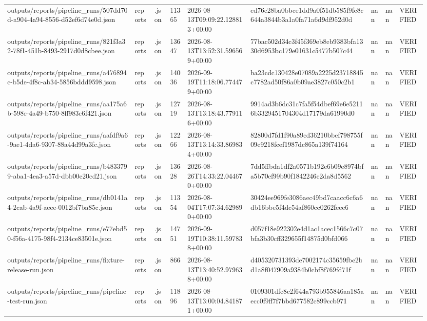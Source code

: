 \begin{longtable}{lllllllll}
outputs/reports/pipeline_runs/507dd70d-a904-4a94-8556-d52ef6d74e0d.json & reports & .json & 11365 & 2026-08-13T09:09:22.128813+00:00 & ed76c28ba0bbce1dd9a0f51db585f9fe8c644a3844b3a1a0fa71a6d9df952d0d & nan & nan & VERIFIED \\
outputs/reports/pipeline_runs/821f3a32-78f1-451b-8493-2917d0d8cbee.json & reports & .json & 13647 & 2026-08-13T13:52:31.596569+00:00 & 77bac502d34c3f45f369eb8eb9383bfa1330d6953bc179e01631c5477b507c44 & nan & nan & VERIFIED \\
outputs/reports/pipeline_runs/a476894c-b5de-4f8c-ab34-5856bddd9598.json & reports & .json & 14036 & 2026-09-19T11:18:06.774479+00:00 & ba23cdc130428e07089a2225d23718845c7782ad50f86a0b09ae3827c050c2b1 & nan & nan & VERIFIED \\
outputs/reports/pipeline_runs/aa175a6b-598e-4a49-b750-8ff983e6f421.json & reports & .json & 12719 & 2026-08-13T13:18:43.779116+00:00 & 9914ad3b6dc31c7fa5f54dbef69e6e52116b3329451704304d17179da61990d0 & nan & nan & VERIFIED \\
outputs/reports/pipeline_runs/aafdf9a6-9ae1-4da6-9307-88a44d99a3fc.json & reports & .json & 12266 & 2026-08-13T13:14:33.869834+00:00 & 82800d7fd1f90a89cd36210bbef798755f09c9218fcef1987dc865a139f74164 & nan & nan & VERIFIED \\
outputs/reports/pipeline_runs/b4833799-aba1-4ea3-a57d-dbb00c20ed21.json & reports & .json & 13628 & 2026-08-26T14:33:22.044670+00:00 & 7dd5ffbda1df2a0571b192e6b09e8974bfa5b70ef99b90f1842246c2da8d5562 & nan & nan & VERIFIED \\
outputs/reports/pipeline_runs/db0141a4-2cab-4a9f-aeee-0012bf7ba85c.json & reports & .json & 11354 & 2026-08-04T17:07:34.629890+00:00 & 30424ee969fe3086aec49bd7caacc6c6a6db16bbe5f4dc54af860cc0262feee6 & nan & nan & VERIFIED \\
outputs/reports/pipeline_runs/e77ebd50-f56a-4175-98f4-2134ce83501e.json & reports & .json & 14751 & 2026-09-19T10:38:11.597838+00:00 & d057f18e922302e4d1ac1acec1566c7c07bfa3b30cff329655f14875d0bfd066 & nan & nan & VERIFIED \\
outputs/reports/pipeline_runs/fixture-release-run.json & reports & .json & 866 & 2026-08-13T13:40:52.979638+00:00 & d405320731393de7002174c35659fbc2bd1a8f047909a9384b0cbf8f769fd71f & nan & nan & VERIFIED \\
outputs/reports/pipeline_runs/pipeline-test-run.json & reports & .json & 11896 & 2026-08-13T13:00:04.841871+00:00 & 0109301dfc8c2f644a793b955846aa185aecc0f9ff7f7bbd677582c899ccb971 & nan & nan & VERIFIED \\
\end{longtable}
\endgroup
